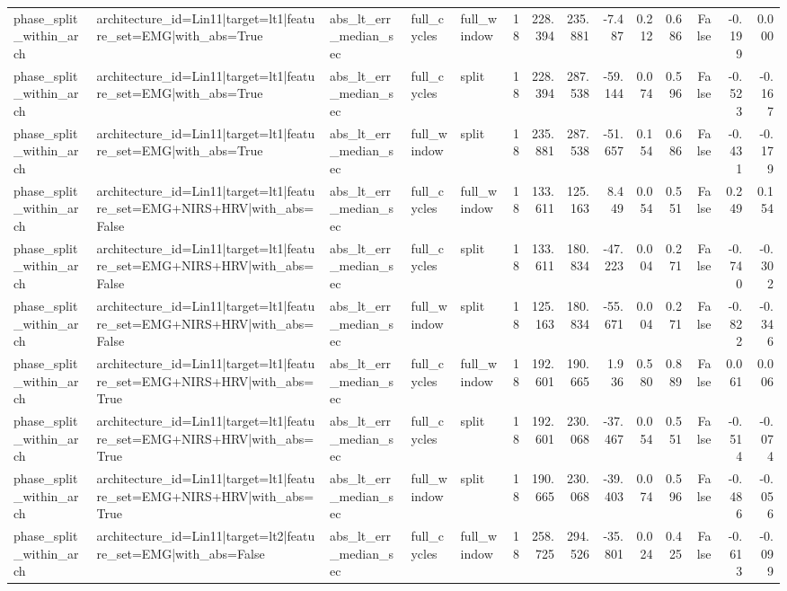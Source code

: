 \begin{table}
\begin{tabular}{lllllrrrrrrrrr}
phase_split_within_arch & architecture_id=Lin11|target=lt1|feature_set=EMG|with_abs=True & abs_lt_err_median_sec & full_cycles & full_window & 18 & 228.394 & 235.881 & -7.487 & 0.212 & 0.686 & False & -0.199 & 0.000 \\
phase_split_within_arch & architecture_id=Lin11|target=lt1|feature_set=EMG|with_abs=True & abs_lt_err_median_sec & full_cycles & split & 18 & 228.394 & 287.538 & -59.144 & 0.074 & 0.596 & False & -0.523 & -0.167 \\
phase_split_within_arch & architecture_id=Lin11|target=lt1|feature_set=EMG|with_abs=True & abs_lt_err_median_sec & full_window & split & 18 & 235.881 & 287.538 & -51.657 & 0.154 & 0.686 & False & -0.431 & -0.179 \\
phase_split_within_arch & architecture_id=Lin11|target=lt1|feature_set=EMG+NIRS+HRV|with_abs=False & abs_lt_err_median_sec & full_cycles & full_window & 18 & 133.611 & 125.163 & 8.449 & 0.054 & 0.551 & False & 0.249 & 0.154 \\
phase_split_within_arch & architecture_id=Lin11|target=lt1|feature_set=EMG+NIRS+HRV|with_abs=False & abs_lt_err_median_sec & full_cycles & split & 18 & 133.611 & 180.834 & -47.223 & 0.004 & 0.271 & False & -0.740 & -0.302 \\
phase_split_within_arch & architecture_id=Lin11|target=lt1|feature_set=EMG+NIRS+HRV|with_abs=False & abs_lt_err_median_sec & full_window & split & 18 & 125.163 & 180.834 & -55.671 & 0.004 & 0.271 & False & -0.822 & -0.346 \\
phase_split_within_arch & architecture_id=Lin11|target=lt1|feature_set=EMG+NIRS+HRV|with_abs=True & abs_lt_err_median_sec & full_cycles & full_window & 18 & 192.601 & 190.665 & 1.936 & 0.580 & 0.889 & False & 0.061 & 0.006 \\
phase_split_within_arch & architecture_id=Lin11|target=lt1|feature_set=EMG+NIRS+HRV|with_abs=True & abs_lt_err_median_sec & full_cycles & split & 18 & 192.601 & 230.068 & -37.467 & 0.054 & 0.551 & False & -0.514 & -0.074 \\
phase_split_within_arch & architecture_id=Lin11|target=lt1|feature_set=EMG+NIRS+HRV|with_abs=True & abs_lt_err_median_sec & full_window & split & 18 & 190.665 & 230.068 & -39.403 & 0.074 & 0.596 & False & -0.486 & -0.056 \\
phase_split_within_arch & architecture_id=Lin11|target=lt2|feature_set=EMG|with_abs=False & abs_lt_err_median_sec & full_cycles & full_window & 18 & 258.725 & 294.526 & -35.801 & 0.024 & 0.425 & False & -0.613 & -0.099 \\

\end{tabular}
\end{table}
